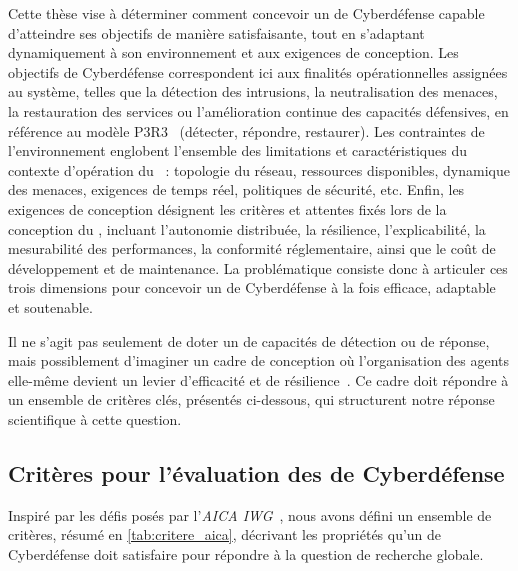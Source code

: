 Cette thèse vise à déterminer comment concevoir un  de Cyberdéfense capable d'atteindre ses objectifs de manière satisfaisante, tout en s'adaptant dynamiquement à son environnement et aux exigences de conception. Les objectifs de Cyberdéfense correspondent ici aux finalités opérationnelles assignées au système, telles que la détection des intrusions, la neutralisation des menaces, la restauration des services ou l'amélioration continue des capacités défensives, en référence au modèle P3R3~\cite{Theron2013P3R3} (détecter, répondre, restaurer). Les contraintes de l'environnement englobent l'ensemble des limitations et caractéristiques du contexte d'opération du ~: topologie du réseau, ressources disponibles, dynamique des menaces, exigences de temps réel, politiques de sécurité, etc. Enfin, les exigences de conception désignent les critères et attentes fixés lors de la conception du , incluant l'autonomie distribuée, la résilience, l'explicabilité, la mesurabilité des performances, la conformité réglementaire, ainsi que le coût de développement et de maintenance. La problématique consiste donc à articuler ces trois dimensions pour concevoir un  de Cyberdéfense à la fois efficace, adaptable et soutenable.

\medskip

\noindent
Il ne s'agit pas seulement de doter un  de capacités de détection ou de réponse, mais possiblement d'imaginer un cadre de conception où l'organisation des agents elle-même devient un levier d'efficacité et de résilience~\cite{Picard2006, DiMarzoSerugendo2006}. Ce cadre doit répondre à un ensemble de critères clés, présentés ci-dessous, qui structurent notre réponse scientifique à cette question.

\subsection*{Critères pour l'évaluation des  de Cyberdéfense}\label{sec:criteres-evaluation}

Inspiré par les défis posés par l'\textit{AICA IWG}~\footnotemark[3], nous avons défini un ensemble de critères, résumé en \autoref{tab:critere_aica}, décrivant les propriétés qu'un  de Cyberdéfense doit satisfaire pour répondre à la question de recherche globale.


